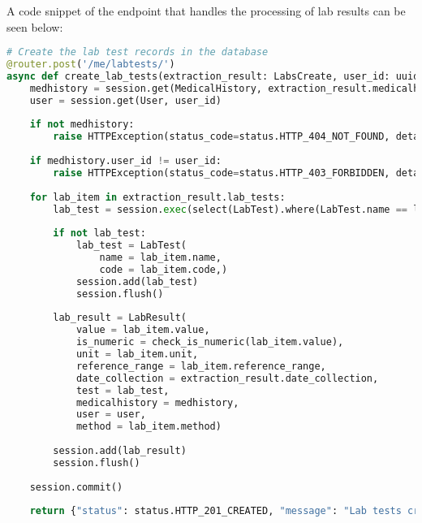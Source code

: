 A code snippet of the endpoint that handles the processing of lab results can be seen below:

\begin{lstlisting}[language=Python, caption=Lab Results Endpoint]
  # Create the lab test records in the database
@router.post('/me/labtests/')
async def create_lab_tests(extraction_result: LabsCreate, user_id: uuid.UUID = Depends(validate_session), session: Session = Depends(get_session)):
    medhistory = session.get(MedicalHistory, extraction_result.medicalhistory_id)
    user = session.get(User, user_id)
    
    if not medhistory:
        raise HTTPException(status_code=status.HTTP_404_NOT_FOUND, detail="Medical history not found")
    
    if medhistory.user_id != user_id:
        raise HTTPException(status_code=status.HTTP_403_FORBIDDEN, detail="Not authorised to access this medical history")
    
    for lab_item in extraction_result.lab_tests:
        lab_test = session.exec(select(LabTest).where(LabTest.name == lab_item.name)).first()
        
        if not lab_test:
            lab_test = LabTest(
                name = lab_item.name,
                code = lab_item.code,)
            session.add(lab_test)
            session.flush()
        
        lab_result = LabResult(
            value = lab_item.value,
            is_numeric = check_is_numeric(lab_item.value),
            unit = lab_item.unit,
            reference_range = lab_item.reference_range,
            date_collection = extraction_result.date_collection,
            test = lab_test,
            medicalhistory = medhistory,
            user = user,
            method = lab_item.method)
        
        session.add(lab_result)
        session.flush()
        
    session.commit()
    
    return {"status": status.HTTP_201_CREATED, "message": "Lab tests created successfully"}
\end{lstlisting}

\noindent\begin{minipage}{\textwidth}
  \begin{center}
      \label{fig:erd_s5}
  \end{center}
\end{minipage}

